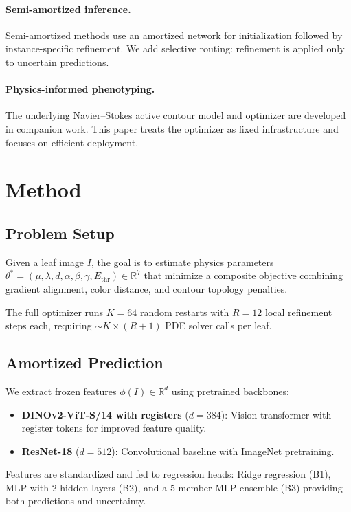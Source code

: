 \documentclass[11pt,a4paper]{article}
\begin{document}
\paragraph{Semi-amortized inference.}
Semi-amortized methods use an amortized network for initialization
followed by instance-specific refinement.
We add selective routing: refinement is applied only to uncertain predictions.

\paragraph{Physics-informed phenotyping.}
The underlying Navier--Stokes active contour model and optimizer are developed
in companion work. This paper treats the optimizer as fixed infrastructure
and focuses on efficient deployment.

\section{Method}
\label{sec:method}

\subsection{Problem Setup}
Given a leaf image $I$, the goal is to estimate physics parameters
$\theta^* = (\mu, \lambda, d, \alpha, \beta, \gamma, E_\text{thr}) \in \mathbb{R}^7$
that minimize a composite objective combining gradient alignment,
color distance, and contour topology penalties.

The full optimizer runs $K=64$ random restarts with $R=12$ local refinement
steps each, requiring ${\sim}K \times (R+1)$ PDE solver calls per leaf.

\subsection{Amortized Prediction}
We extract frozen features $\phi(I) \in \mathbb{R}^d$ using pretrained backbones:
\begin{itemize}
\item \textbf{DINOv2-ViT-S/14 with registers} ($d=384$): Vision transformer
  with register tokens for improved feature quality.
\item \textbf{ResNet-18} ($d=512$): Convolutional baseline with ImageNet pretraining.
\end{itemize}

Features are standardized and fed to regression heads:
Ridge regression (B1), MLP with 2 hidden layers (B2),
and a 5-member MLP ensemble (B3) providing both predictions and uncertainty.
\end{document}
